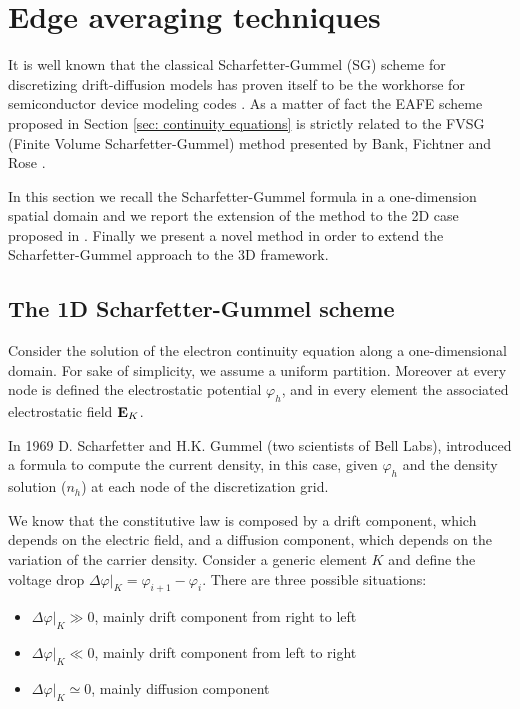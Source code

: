%
%
%
%

 
 
\section{Edge averaging techniques} 
 
It is well known that the classical Scharfetter-Gummel (SG) scheme for discretizing drift-diffusion models has proven  itself to be the workhorse for semiconductor device modeling codes \cite{Gummel:SignAnalys}. As a matter of fact the EAFE scheme proposed in Section \ref{sec: continuity equations} is strictly related to the FVSG (Finite Volume Scharfetter-Gummel) method presented by Bank, Fichtner and Rose \cite{Bank:FVSG}. 

In this section we recall the Scharfetter-Gummel formula in a one-dimension spatial domain and we report the extension of the method to the 2D case proposed in \cite{Bank:FEvsBOX}. Finally we present a novel method in order to extend the Scharfetter-Gummel approach to the 3D framework.

\subsection{The 1D Scharfetter-Gummel scheme}

Consider the solution of the electron continuity equation along a one-dimensional domain. For sake of simplicity, we assume a uniform partition. Moreover at every node is defined the electrostatic potential $\varphi_h$, and in every element the associated electrostatic field $\mathbf{E}_K$.

 In 1969 D. Scharfetter and H.K. Gummel (two scientists of Bell Labs), introduced a formula to compute the current density, in this case, given $\varphi_h$ and the density solution ($n_h$) at each node of the discretization grid. 
 
We know that the constitutive law is composed by a drift component, which depends on the electric field, and a diffusion component, which depends on the variation of the carrier density. Consider a generic element $K$ and define the voltage drop $\Delta \varphi|_K=\varphi_{i+1}-\varphi_{i}$. There are three possible situations: 
\begin{itemize}
\item $\Delta \varphi|_K \gg0$, mainly drift component from right to left 
\item $\Delta \varphi|_K \ll0$, mainly drift component from left to right
\item $\Delta \varphi|_K \simeq 0$, mainly diffusion component
\end{itemize} 
 
